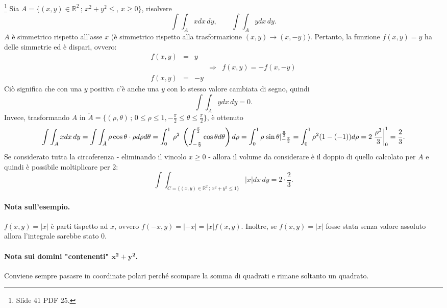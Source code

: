 \begin{example}\footnote{Slide 41 PDF 25.}
	Sia $A=\{(x,y)\in\mathbb{R}^2\,;\, x^2+y^2\leq,\, x\geq 0\}$, risolvere
	\begin{equation*}
		\int\int_A x dx\,dy,\qquad \int\int_A y dx\, dy.
	\end{equation*}
	$A$ è simmetrico rispetto all'asse $x$ (è simmetrico rispetto alla trasformazione $(x,y)\rightarrow(x,-y)$). Pertanto, la funzione $f(x,y)=y$ ha delle simmetrie ed è dispari, ovvero:
	\begin{equation*}
		\begin{matrix}
			f(x,y)&=& y\\
			&&&\Rightarrow& f(x,y) = - f(x,-y)\\
			f(x,y) &=& -y
		\end{matrix}
	\end{equation*}
	Ciò significa che con una $y$ positiva c'è anche una $y$ con lo stesso valore cambiata di segno, quindi
	\begin{equation*}
		\int\int_A y dx\, dy = 0.
	\end{equation*}
	Invece, trasformando $A$ in $\tilde{A}=\{(\rho, \theta)\,;\, 0\leq \rho\leq 1, -\frac{\pi}{2}\leq \theta\leq \frac{\pi}{2}\}$, è ottenuto
	\begin{equation*}
		\int\int_A x dx\, dy = \int\int_{\tilde{A}}  \rho\cos\theta\cdot\rho d\rho d\theta  = \int_0^1\, \rho^2\; \left(\int_{-\frac{\pi}{2}}^{\frac{\pi}{2}}\cos\theta d\theta\right)d\rho = \int_0^1\rho\left.\sin\theta\right\rvert_{-\frac{\pi}{2}}^{\frac{\pi}{2}} = \int_0^1\rho^2(1-(-1))d\rho = 2 \left.\frac{\rho^3}{3}\right\rvert_{0}^{1} = \frac{2}{3}.
	\end{equation*}
	Se considerato tutta la circoferenza - eliminando il vincolo $x\geq 0$ - allora il volume da considerare è il doppio di quello calcolato per $A$ e quindi è possibile moltiplicare per 2:
	\begin{equation*}
		\int\int_{C=\{(x,y)\in\mathbb{R}^2\,;\, x^2+y^2\leq 1\}} |x| dx\, dy = 2\cdot\frac{2}{3}.
	\end{equation*}
\end{example}
\paragraph{Nota sull'esempio.} $f(x,y)=|x|$ è parti tispetto ad $x$, ovvero $f(-x,y) = |-x| = |x| f(x,y)$. Inoltre, se $f(x,y)=|x|$ fosse stata senza valore assoluto allora l'integrale sarebbe stato 0.

\paragraph{Nota sui domini "contenenti" $\boldsymbol{x^2+y^2}$.} Conviene sempre pasasre in coordinate polari perché scompare la somma di quadrati e rimane soltanto un quadrato.

